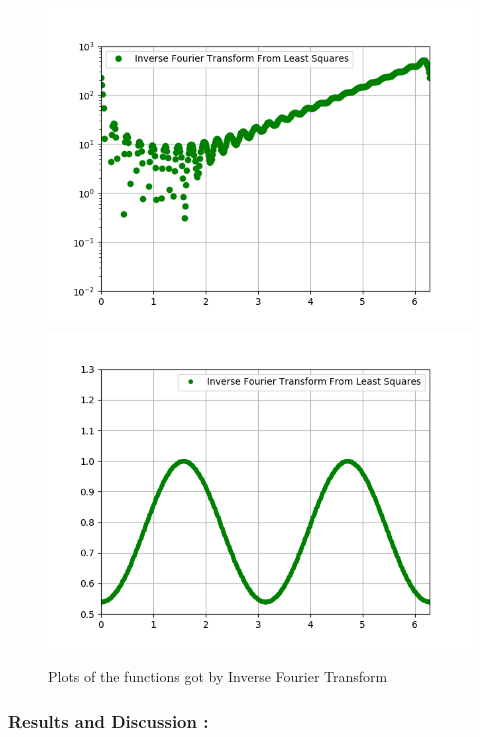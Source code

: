\documentclass[11pt, a4paper]{article}
\begin{document}
\begin{figure}[!tbh]
     \centering
     \includegraphics[scale=0.8]{./../Extras/15.png}  
     \includegraphics[scale=0.8]{./../Extras/16.png}  
     \caption{Plots of the functions got by Inverse Fourier Transform}
\end{figure}
\subsubsection{Results and Discussion :}\label{results-and-discussion}
\end{document}
